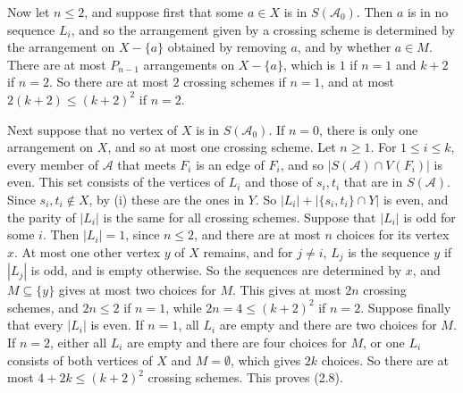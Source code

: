 {Now let $n \le 2$, and suppose first that some $a \in X$ is in $S(\mathscr{A}_0)$. Then $a$ is in
no sequence $L_i$, and so the arrangement given by a crossing scheme is determined by the arrangement
on $X - \{a\}$ obtained by removing $a$, and by whether $a \in M$. There are at most $P_{n-1}$
arrangements on $X - \{a\}$, which is $1$ if $n = 1$ and $k+2$ if $n = 2$. So there are at most $2$
crossing schemes if $n = 1$, and at most $2(k+2) \le (k+2)^2$ if $n = 2$.

Next suppose that no vertex of $X$ is in $S(\mathscr{A}_0)$. If $n = 0$, there is only one
arrangement on $X$, and so at most one crossing scheme. Let $n \ge 1$. For $1 \le i \le k$, every
member of $\mathscr{A}$ that meets $F_i$ is an edge of $F_i$, and so $|S(\mathscr{A}) \cap V(F_i)|$ is
even. This set consists of the vertices of $L_i$ and those of $s_i, t_i$ that are in
$S(\mathscr{A})$. Since $s_i, t_i \notin X$, by (i) these are the ones in $Y$. So
$|L_i| + |\{s_i, t_i\} \cap Y|$ is even, and the parity of $|L_i|$ is the same for all crossing
schemes. Suppose that $|L_i|$ is odd for some $i$. Then $|L_i| = 1$, since $n \le 2$, and there are
at most $n$ choices for its vertex $x$. At most one other vertex $y$ of $X$ remains, and for
$j \ne i$, $L_j$ is the sequence $y$ if $|L_j|$ is odd, and is empty otherwise. So the sequences are
determined by $x$, and $M \subseteq \{y\}$ gives at most two choices for $M$. This gives at most
$2n$ crossing schemes, and $2n \le 2$ if $n = 1$, while $2n = 4 \le (k+2)^2$ if $n = 2$. Suppose
finally that every $|L_i|$ is even. If $n = 1$, all $L_i$ are empty and there are two choices for $M$.
If $n = 2$, either all $L_i$ are empty and there are four choices for $M$, or one $L_i$ consists of
both vertices of $X$ and $M = \emptyset$, which gives $2k$ choices. So there are at most
$4 + 2k \le (k+2)^2$ crossing schemes. This proves (2.8).}

